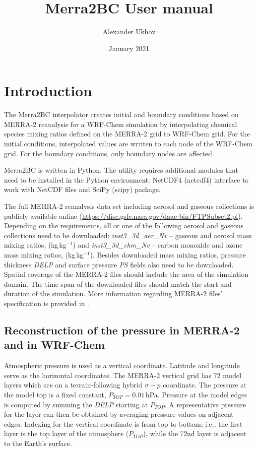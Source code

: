 \documentclass{article}
\title{Merra2BC User manual}
\author{Alexander Ukhov}
\date{January 2021}
\begin{document}
\maketitle

\section{Introduction}
\label{MERRA2BC}

The {Merra2BC} interpolator creates initial and boundary conditions based on MERRA-2 reanalysis \citep{randles2017merra} for a WRF-Chem simulation by interpolating chemical species mixing ratios defined on the MERRA-2 grid to WRF-Chem grid. For the initial conditions, interpolated values are written to each node of the WRF-Chem grid. For the boundary conditions, only boundary nodes are affected.

{Merra2BC} is written in Python. The utility requires additional modules that need to be installed in the Python environment: NetCDF4 (netcdf4) interface to work with NetCDF files and SciPy (scipy) package.

The full MERRA-2 reanalysis data set including aerosol and gaseous collections is publicly available online (\url{https://disc.gsfc.nasa.gov/daac-bin/FTPSubset2.pl}). Depending on the requirements, all or one of the following aerosol and gaseous collections need to be downloaded:
\textit{inst3\_3d\_aer\_Nv} -- gaseous and aerosol mass mixing ratios, (kg\,kg$^{-1}$) and
\textit{inst3\_3d\_chm\_Nv} -- carbon monoxide and ozone mass mixing ratios, (kg\,kg$^{-1}$). Besides downloaded mass mixing ratios, pressure thickness \textit{DELP} and surface pressure \textit{PS} fields also need to be downloaded. Spatial coverage of the MERRA-2 files should include the area of the simulation domain. The time span of the downloaded files should match  the start and duration of the simulation. More information regarding MERRA-2 files' specification is provided in \citep{bosilovich2016merra}.

\subsection{Reconstruction of the pressure in MERRA-2 and in WRF-Chem}

Atmospheric pressure is used as a vertical coordinate. Latitude and longitude serve as the horizontal coordinates. The MERRA-2 vertical grid has 72 model layers which are on a terrain-following hybrid $\sigma-p$ coordinate. The pressure at the model top is a fixed constant, $P_{TOP}=0.01$\,\unit{hPa}. Pressure at the model edges is computed by summing the \textit{DELP} starting at $P_{TOP}$. A representative pressure for the layer can then be obtained by averaging pressure values on adjacent edges. Indexing for the vertical coordinate is from top to bottom; i.e., the first layer is the top layer of the atmosphere ($P_{TOP}$), while the 72nd layer is adjacent to the Earth's surface.
\end{document}
